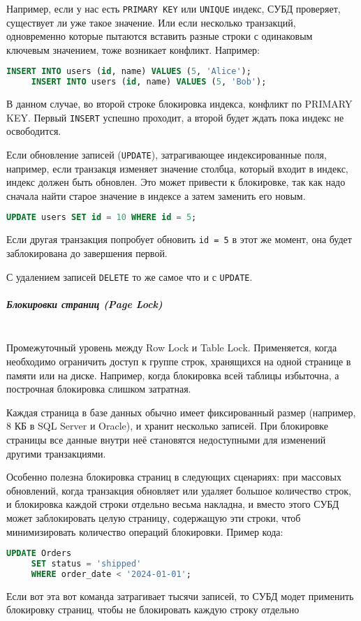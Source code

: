  Например, если у нас есть \texttt{PRIMARY KEY} или \texttt{UNIQUE} индекс, СУБД проверяет, существует ли уже такое значение. Или если несколько транзакций, одновременно которые пытаются вставить разные строки с одинаковым ключевым значением, тоже возникает конфликт. Например:
 \begin{lstlisting}[language=SQL]
     INSERT INTO users (id, name) VALUES (5, 'Alice');
     INSERT INTO users (id, name) VALUES (5, 'Bob');
 \end{lstlisting}
 В данном случае, во второй строке блокировка индекса, конфликт по PRIMARY KEY. Первый \texttt{INSERT} успешно проходит, а второй будет ждать пока индекс не освободится.
 
 Если обновление записей (\texttt{UPDATE}), затрагивающее индексированные поля, например, если транзакця изменяет значение столбца, который входит в индекс, индекс должен быть обновлен. Это может привести к блокировке, так как надо сначала найти старое значение в индексе а затем заменить его новым.
 \begin{lstlisting}[language=SQL]
     UPDATE users SET id = 10 WHERE id = 5;
 \end{lstlisting}
 Если другая транзакция попробует обновить \texttt{id = 5} в этот же момент, она будет заблокирована до завершения первой.
 
 С удалением записей \texttt{DELETE} то же самое что и с \texttt{UPDATE}.
 
 \subparagraph{Блокировки страниц (Page Lock)} ~\\
 Промежуточный уровень между Row Lock и Table Lock. Применяется, когда необходимо ограничить доступ к группе строк, хранящихся на одной странице в памяти или на диске. Например, когда блокировка всей таблицы избыточна, а построчная блокировка слишком затратная.
 
 Каждая страница в базе данных обычно имеет фиксированный размер (например, 8 КБ в SQL Server и Oracle), и хранит несколько записей. При блокировке страницы все данные внутри неё становятся недоступными для изменений другими транзакциями.
 
 Особенно полезна блокировка страниц в следующих сценариях: при массовых обновлений, когда транзакция обновляет или удаляет большое количество строк, и блокировка каждой строки отдельно весьма накладна, и вместо этого СУБД может заблокировать целую страницу, содержащую эти строки, чтоб минимизировать количество операций блокировки.
 Пример кода:
 \begin{lstlisting}[language=SQL]
     UPDATE Orders
     SET status = 'shipped' 
     WHERE order_date < '2024-01-01';
 \end{lstlisting}
 Если вот эта вот команда затрагивает тысячи записей, то СУБД модет применить блокировку страниц, чтобы не блокировать каждую строку отдельно
 
